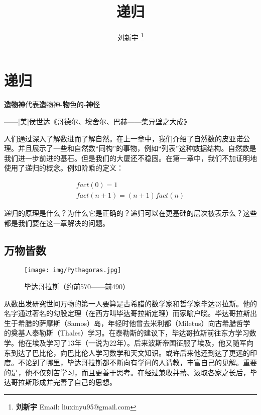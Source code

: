 \documentclass[UTF8]{article}
\begin{document}
\title{递归}

\author{刘新宇
\thanks{{\bfseries 刘新宇} \newline
  Email: liuxinyu95@gmail.com \newline}
  }

\maketitle
\fi


\ifx\wholebook\relax
\chapter{递归}
\fi

\epigraph{\textbf{造物神}代表\textbf{造}物神-\textbf{物}色的-\textbf{神}怪}{——[美]侯世达《哥德尔、埃舍尔、巴赫——集异壁之大成》}

人们通过深入了解数进而了解自然。在上一章中，我们介绍了自然数的皮亚诺公理。并且展示了一些和自然数“同构”的事物，例如“列表”这种数据结构。自然数是我们进一步前进的基石。但是我们的大厦还不稳固。在第一章中，我们不加证明地使用了递归的概念。例如阶乘的定义：

\[
\begin{array}{l}
\textit{fact}(0) = 1 \\
\textit{fact}(n + 1) = (n + 1) \textit{fact}(n)
\end{array}
\]

递归的原理是什么？为什么它是正确的？递归可以在更基础的层次被表示么？这些都是我们要在这一章解决的问题。

\section{万物皆数}

\begin{figure}[htbp]
 \centering
 \texttt{[image: img/Pythagoras.jpg]}
 \captionsetup{labelformat=empty}
 \caption{毕达哥拉斯（约前570——前490）}
 \label{fig:Pythagoras}
\end{figure}

从数出发研究世间万物的第一人要算是古希腊的数学家和哲学家毕达哥拉斯。他的名字通过著名的勾股定理（在西方叫毕达哥拉斯定理）而家喻户晓。毕达哥拉斯出生于希腊的萨摩斯（Samos）岛，年轻时他曾去米利都（Miletus）向古希腊哲学的奠基人泰勒斯（Thales）学习。在泰勒斯的建议下，毕达哥拉斯前往东方学习数学。他在埃及学习了13年（一说为22年）。后来波斯帝国征服了埃及，他又随军向东到达了巴比伦，向巴比伦人学习数学和天文知识。或许后来他还到达了更远的印度。不论到了哪里，毕达哥拉斯都不断向有学问的人请教，丰富自己的见解。重要的是，他不仅刻苦学习，而且更善于思考。在经过兼收并蓄、汲取各家之长后，毕达哥拉斯形成并完善了自己的思想\cite{HanXueTao16}。
\end{document}

